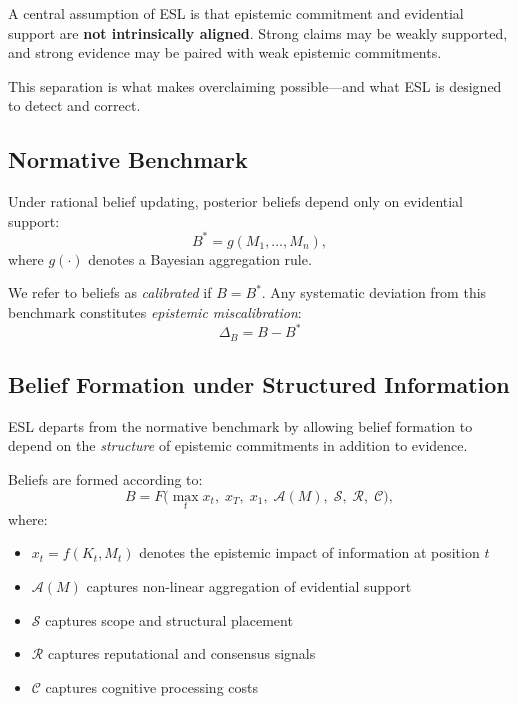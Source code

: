 \documentclass[11pt,a4paper]{article}
\begin{document}
\begin{principlebox}
A central assumption of ESL is that epistemic commitment and evidential support are \textbf{not intrinsically aligned}. Strong claims may be weakly supported, and strong evidence may be paired with weak epistemic commitments.

This separation is what makes overclaiming possible---and what ESL is designed to detect and correct.
\end{principlebox}


\subsection{Normative Benchmark}

Under rational belief updating, posterior beliefs depend only on evidential support:
\begin{equation}
B^* = g(M_1, \dots, M_n),
\end{equation}
where $g(\cdot)$ denotes a Bayesian aggregation rule.

We refer to beliefs as \emph{calibrated} if $B = B^*$. Any systematic deviation from this benchmark constitutes \emph{epistemic miscalibration}:
\begin{equation}
\Delta_B = B - B^*
\end{equation}


\subsection{Belief Formation under Structured Information}

ESL departs from the normative benchmark by allowing belief formation to depend on the \emph{structure} of epistemic commitments in addition to evidence.

\begin{termbox}
Beliefs are formed according to:
\begin{equation}
B = F\!\Big(
\max_t x_t,\;
x_T,\;
x_1,\;
\mathcal{A}(M),\;
\mathcal{S},\;
\mathcal{R},\;
\mathcal{C}
\Big),
\end{equation}
where:
\begin{itemize}
    \item $x_t = f(K_t, M_t)$ denotes the epistemic impact of information at position $t$
    \item $\mathcal{A}(M)$ captures non-linear aggregation of evidential support
    \item $\mathcal{S}$ captures scope and structural placement
    \item $\mathcal{R}$ captures reputational and consensus signals
    \item $\mathcal{C}$ captures cognitive processing costs
\end{itemize}
\end{termbox}
\end{document}
